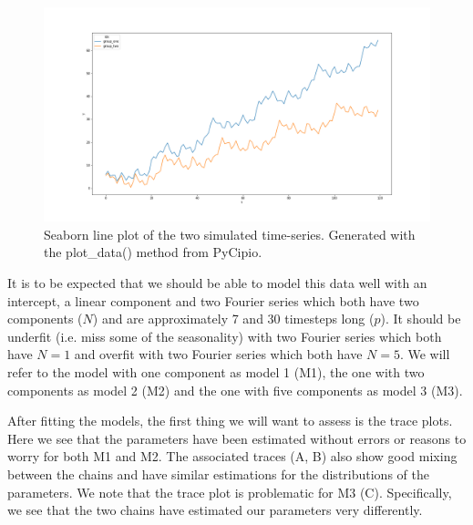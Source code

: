 \documentclass{article}
\begin{document}
\begin{figure}[H]
    \centerline{\includegraphics[scale = 0.45]{../plots/ex1_plot_data.png}}
    \caption{Seaborn line plot of the two simulated time-series. Generated with the plot\_data() method from PyCipio.}
\end{figure}

It is to be expected that we should be able to model this data well with an intercept, a linear component and two Fourier series which both have two components ($N$) and are approximately 7 and 30 timesteps long ($p$). It should be underfit (i.e. miss some of the seasonality) with two Fourier series which both have $N = 1$ and overfit with two Fourier series which both have $N = 5$. We will refer to the model with one component as model 1 (M1), the one with two components as model 2 (M2) and the one with five components as model 3 (M3).

After fitting the models, the first thing we will want to assess is the trace plots. Here we see that the parameters have been estimated without errors or reasons to worry for both M1 and M2. The associated traces (A, B) also show good mixing between the chains and have similar estimations for the distributions of the parameters. We note that the trace plot is problematic for M3 (C). Specifically, we see that the two chains have estimated our parameters very differently.
\end{document}
